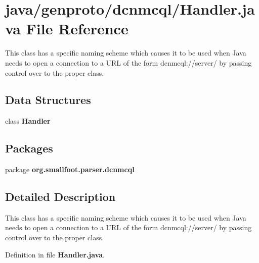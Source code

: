 \section{java/genproto/dcnmcql/\+Handler.java File Reference}
\label{dcnmcql_2Handler_8java}


This class has a specific naming scheme which causes it to be used when Java needs to open a connection to a U\+R\+L of the form dcnmcql\+://server/ by passing control over to the proper class.  


\subsection*{Data Structures}
\begin{DoxyCompactItemize}
\item 
class {\bf Handler}
\end{DoxyCompactItemize}
\subsection*{Packages}
\begin{DoxyCompactItemize}
\item 
package {\bf org.\+smallfoot.\+parser.\+dcnmcql}
\end{DoxyCompactItemize}


\subsection{Detailed Description}
This class has a specific naming scheme which causes it to be used when Java needs to open a connection to a U\+R\+L of the form dcnmcql\+://server/ by passing control over to the proper class. 



Definition in file {\bf Handler.\+java}.

